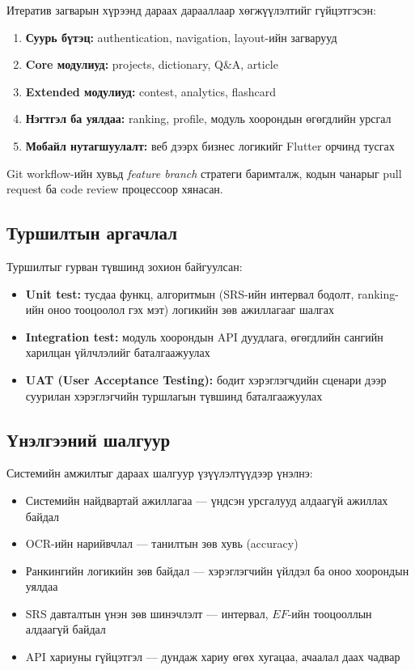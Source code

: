 Итератив загварын хүрээнд дараах дарааллаар хөгжүүлэлтийг гүйцэтгэсэн:

\begin{enumerate}[leftmargin=2em]
    \item \textbf{Суурь бүтэц:} authentication, navigation, layout-ийн загварууд
    \item \textbf{Core модулиуд:}  projects, dictionary, Q\&A, article
    \item \textbf{Extended модулиуд:} contest, analytics, flashcard
    \item \textbf{Нэгтгэл ба уялдаа:} ranking, profile, модуль хоорондын өгөгдлийн урсгал
    \item \textbf{Мобайл нутагшуулалт:} веб дээрх бизнес логикийг Flutter орчинд тусгах
\end{enumerate}

Git workflow-ийн хувьд \textit{feature branch} стратеги баримталж, кодын чанарыг pull request ба code review процессоор хянасан. 

\subsection{Туршилтын аргачлал}

Туршилтыг гурван түвшинд зохион байгуулсан:

\begin{itemize}
    \item \textbf{Unit test:} тусдаа функц, алгоритмын (SRS-ийн интервал бодолт, ranking-ийн оноо тооцоолол гэх мэт) логикийн зөв ажиллагааг шалгах
    \item \textbf{Integration test:} модуль хоорондын API дуудлага, өгөгдлийн сангийн харилцан үйлчлэлийг баталгаажуулах
    \item \textbf{UAT (User Acceptance Testing):} бодит хэрэглэгчдийн сценари дээр суурилан хэрэглэгчийн туршлагын түвшинд баталгаажуулах
\end{itemize}

\subsection{Үнэлгээний шалгуур}

Системийн амжилтыг дараах шалгуур үзүүлэлтүүдээр үнэлнэ:

\begin{itemize}[leftmargin=2em]
    \item Системийн найдвартай ажиллагаа --- үндсэн урсгалууд алдаагүй ажиллах байдал
    \item OCR-ийн нарийвчлал --- танилтын зөв хувь (accuracy)
    \item Ранкингийн логикийн зөв байдал --- хэрэглэгчийн үйлдэл ба оноо хоорондын уялдаа
    \item SRS давталтын үнэн зөв шинэчлэлт --- интервал, $EF$-ийн тооцооллын алдаагүй байдал
    \item API хариуны гүйцэтгэл --- дундаж хариу өгөх хугацаа, ачаалал даах чадвар
\end{itemize}